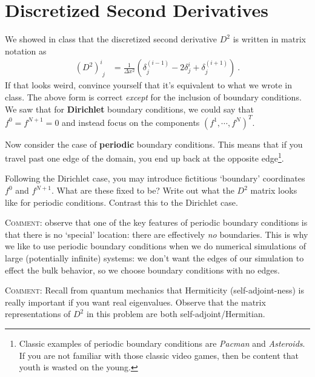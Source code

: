 \documentclass[12pt]{article}
\numberwithin{equation}{section}    %
\begin{document}
\section{Discretized Second Derivatives}

We showed in class that the discretized second derivative $D^2$ is written in matrix notation as
\begin{align}
	\left(D^2\right)^i_{\phantom{i}j}
	&= 
	\frac{1}{\Delta x^2}
	\left(
	\delta_j^{(i-1)}
	- 2 \delta_j^{i}
	+
	\delta_j^{(i+1)}
	\right) \ .
\end{align}
If that looks weird, convince yourself that it's equivalent to what we wrote in class. The above form is correct \emph{except} for the inclusion of boundary conditions. We saw that for \textbf{Dirichlet} boundary conditions, we could say that $f^0 = f^{N+1} = 0$ and instead focus on the components $\left(f^1, \cdots, f^N\right)^T$. 

Now consider the case of \textbf{periodic} boundary conditions. This means that if you travel past one edge of the domain, you end up back at the opposite edge\footnote{Classic examples of periodic boundary conditions are \emph{Pacman} and \emph{Asteroids}. If you are not familiar with those classic video games, then be content that youth is wasted on the young.}.

Following the Dirichlet case, you may introduce fictitious `boundary' coordinates $f^0$ and $f^{N+1}$. What are these fixed to be? Write out what the $D^2$ matrix looks like for periodic conditions. Contrast this to the Dirichlet case.

\textsc{Comment}: observe that one of the key features of periodic boundary conditions is that there is no `special' location: there are effectively \emph{no} boundaries. This is why we like to use periodic boundary conditions when we do numerical simulations of large (potentially infinite) systems: we don't want the edges of our simulation to effect the bulk behavior, so we choose boundary conditions with no edges.

\textsc{Comment}: Recall from quantum mechanics that Hermiticity (self-adjoint-ness) is really important if you want real eigenvalues. Observe that the matrix representations of $D^2$ in this problem are both self-adjoint/Hermitian. 
\end{document}

